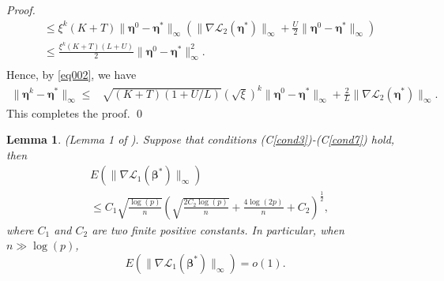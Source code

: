 \documentclass[12pt]{article}
\newtheorem{lemma}{Lemma}
\newcommand{\bbeta}{\boldsymbol{\beta}}
\newcommand{\boldeta}{\boldsymbol{\eta}}
\begin{document}
\begin{appendix}
\begin{proof}
{\begin{equation*}
\begin{split}
&\leq\xi^k(K+T)\|\boldeta^0-\boldeta^*\|_{\infty}(\|\nabla \mathcal{L}_2(\boldeta^*)\|_{\infty}+\frac{U}{2}\|\boldeta^0-\boldeta^*\|_{\infty})\\
&\leq\frac{\xi^k(K+T)(L+U)}{2}\|\boldeta^0-\boldeta^*\|_{\infty}^2.\\
\end{split}
\end{equation*}
}
Hence, by \eqref{eq002}, we have
\begin{equation*}
\begin{split}
\|\boldeta^{k}-\boldeta^{*}\|_{\infty}\leq&
\sqrt{(K+T)(1+U/L)}(\sqrt{\xi})^k\|\boldeta^0-\boldeta^*\|_{\infty}+\frac{2}{L}\|\nabla \mathcal{L}_2(\boldeta^*)\|_{\infty}.
\end{split}
\end{equation*}
This completes the proof.
\qed
\end{proof}
\begin{lemma}\label{Le}(Lemma 1 of   %
\cite{huang2010variable}).
Suppose that conditions %
(C\ref{cond3})-(C\ref{cond7})
 hold, then
\begin{equation*}
\begin{split}
&E\left(\|\nabla \mathcal{L}_1(\bbeta^*)\|_\infty\right)\\
&\leq C_1\sqrt{\frac{\log(p)}{n}}\left(\sqrt{\frac{2C_2\log(p)}{n}}+\frac{4\log(2p)}{n}+C_2\right)^{\frac{1}{2}},
\end{split}
\end{equation*}
where $C_1$ and $C_2$ are two finite positive constants. In particular, when $n\gg\log(p)$,
$$E\left(\|\nabla \mathcal{L}_1(\bbeta^*)\|_\infty\right)=o(1).$$
\end{lemma}

\end{appendix}
\end{document}
